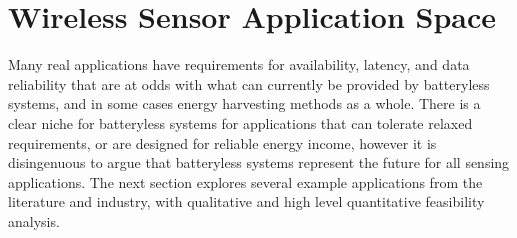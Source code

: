 



\section{Wireless Sensor Application Space}
\label{sec:background:app}
Many real applications have requirements for availability, latency, and data reliability that are at odds with what can currently be provided by batteryless systems, and in some cases energy harvesting methods as a whole. 
There is a clear niche for batteryless systems for applications that can tolerate relaxed requirements, or are designed for reliable energy income, however it is disingenuous to argue that batteryless systems represent the future for all sensing applications.
The next section explores several example applications from the literature and industry, with qualitative and high level quantitative feasibility analysis.

